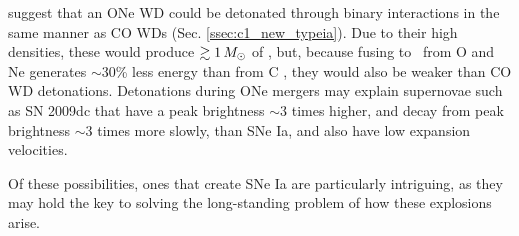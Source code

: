 \begin{itemize}
\cite{marq+15} suggest that an ONe WD could be detonated through binary interactions in the same manner as CO WDs (Sec. \ref{ssec:c1_new_typeia}).  Due to their high densities, these would produce $\gtrsim1\,\Msun$ of \Ni, but, because fusing to \Ni\ from O and Ne generates $\sim30$\% less energy than from C \citep{marq+15}, they would also be weaker than CO WD detonations.  Detonations during ONe mergers may explain supernovae such as SN 2009dc \citep{taub+09} that have a peak brightness $\sim3$ times higher, and decay from peak brightness $\sim3$ times more slowly, than SNe Ia, and also have low expansion velocities.

\end{itemize}

Of these possibilities, ones that create SNe Ia are particularly intriguing, as they may hold the key to solving the long-standing problem of how these explosions arise.
